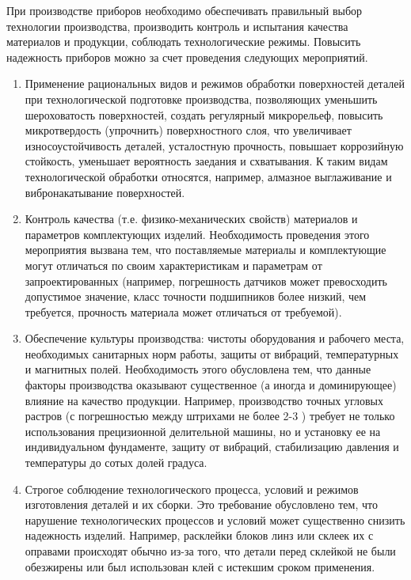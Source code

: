 При производстве приборов необходимо обеспечивать правильный выбор технологии производства, производить контроль и испытания качества материалов и продукции, соблюдать технологические режимы. Повысить надежность приборов можно за счет проведения следующих мероприятий.
\begin{enumerate}
\item  Применение рациональных видов и режимов обработки поверхностей деталей при технологической подготовке производства, позволяющих уменьшить шероховатость поверхностей, создать регулярный микрорельеф, повысить микротвердость (упрочнить) поверхностного слоя, что увеличивает износоустойчивость деталей, усталостную прочность, повышает коррозийную стойкость, уменьшает вероятность заедания и схватывания. К таким видам технологической обработки относятся, например, алмазное выглаживание и вибронакатывание поверхностей.
\item Контроль качества (т.е. физико-механических свойств) материалов и параметров комплектующих изделий. Необходимость проведения этого мероприятия вызвана тем, что поставляемые материалы и комплектующие могут отличаться по своим характеристикам и параметрам от запроектированных (например, погрешность датчиков может превосходить допустимое значение, класс точности подшипников более низкий, чем требуется, прочность материала может отличаться от требуемой).
\item Обеспечение культуры производства: чистоты оборудования и рабочего места, необходимых санитарных норм работы, защиты от вибраций, температурных и магнитных полей. Необходимость этого обусловлена тем, что данные факторы производства оказывают существенное (а иногда и доминирующее) влияние на качество продукции. Например, производство точных угловых растров (с погрешностью между штрихами не более 2-3 ) требует не только использования прецизионной делительной машины, но и установку ее на индивидуальном фундаменте, защиту от вибраций, стабилизацию давления и температуры до сотых долей градуса.
\item Строгое соблюдение технологического процесса, условий и режимов изготовления деталей и их сборки. Это требование обусловлено тем, что нарушение технологических процессов и условий может существенно снизить надежность изделий. Например, расклейки блоков линз или склеек их с оправами происходят обычно из-за того, что детали перед склейкой не были обезжирены или был использован клей с истекшим сроком применения.

\end{enumerate}
